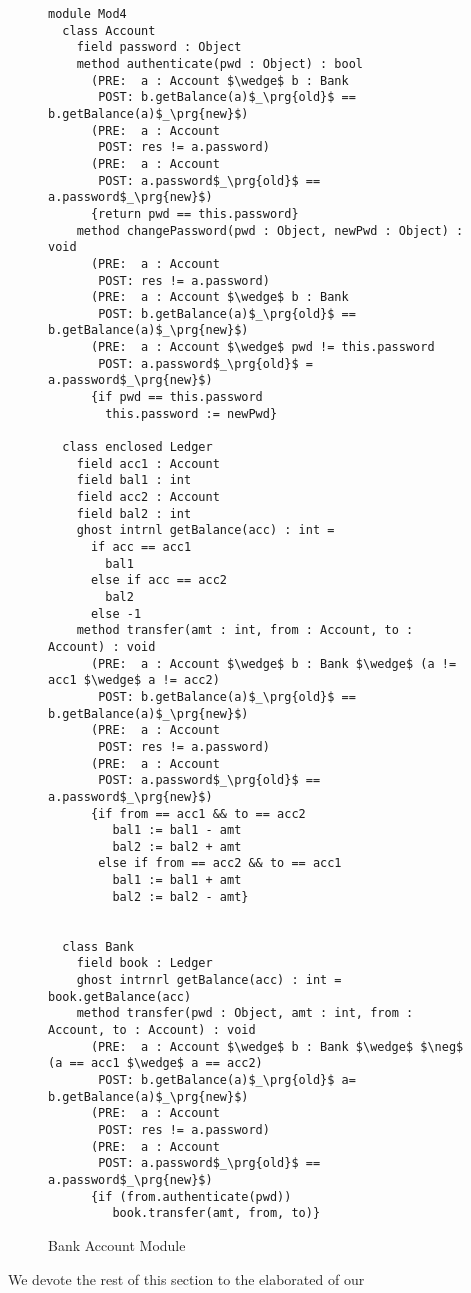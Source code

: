 \begin{figure}[t]
\begin{lstlisting}[mathescape=true, frame=lines]
module Mod4
  class Account
    field password : Object
    method authenticate(pwd : Object) : bool
      (PRE:  a : Account $\wedge$ b : Bank
       POST: b.getBalance(a)$_\prg{old}$ == b.getBalance(a)$_\prg{new}$)
      (PRE:  a : Account
       POST: res != a.password)
      (PRE:  a : Account
       POST: a.password$_\prg{old}$ == a.password$_\prg{new}$)
      {return pwd == this.password}
    method changePassword(pwd : Object, newPwd : Object) : void
      (PRE:  a : Account
       POST: res != a.password)
      (PRE:  a : Account $\wedge$ b : Bank
       POST: b.getBalance(a)$_\prg{old}$ == b.getBalance(a)$_\prg{new}$)
      (PRE:  a : Account $\wedge$ pwd != this.password
       POST: a.password$_\prg{old}$ = a.password$_\prg{new}$)
      {if pwd == this.password
        this.password := newPwd}

  class enclosed Ledger
    field acc1 : Account
    field bal1 : int
    field acc2 : Account
    field bal2 : int
    ghost intrnl getBalance(acc) : int = 
      if acc == acc1
        bal1
      else if acc == acc2
        bal2
      else -1
    method transfer(amt : int, from : Account, to : Account) : void
      (PRE:  a : Account $\wedge$ b : Bank $\wedge$ (a != acc1 $\wedge$ a != acc2)
       POST: b.getBalance(a)$_\prg{old}$ == b.getBalance(a)$_\prg{new}$)
      (PRE:  a : Account
       POST: res != a.password)
      (PRE:  a : Account
       POST: a.password$_\prg{old}$ == a.password$_\prg{new}$)
      {if from == acc1 && to == acc2
         bal1 := bal1 - amt
         bal2 := bal2 + amt
       else if from == acc2 && to == acc1
         bal1 := bal1 + amt
         bal2 := bal2 - amt}
      

  class Bank
    field book : Ledger
    ghost intrnrl getBalance(acc) : int = book.getBalance(acc)
    method transfer(pwd : Object, amt : int, from : Account, to : Account) : void
      (PRE:  a : Account $\wedge$ b : Bank $\wedge$ $\neg$ (a == acc1 $\wedge$ a == acc2)
       POST: b.getBalance(a)$_\prg{old}$ a= b.getBalance(a)$_\prg{new}$)
      (PRE:  a : Account
       POST: res != a.password)
      (PRE:  a : Account
       POST: a.password$_\prg{old}$ == a.password$_\prg{new}$)
      {if (from.authenticate(pwd))
         book.transfer(amt, from, to)}
\end{lstlisting}
\caption{Bank Account Module}
\label{f:ex-bank}
\end{figure}
We devote the rest of this section to the elaborated  of  our
